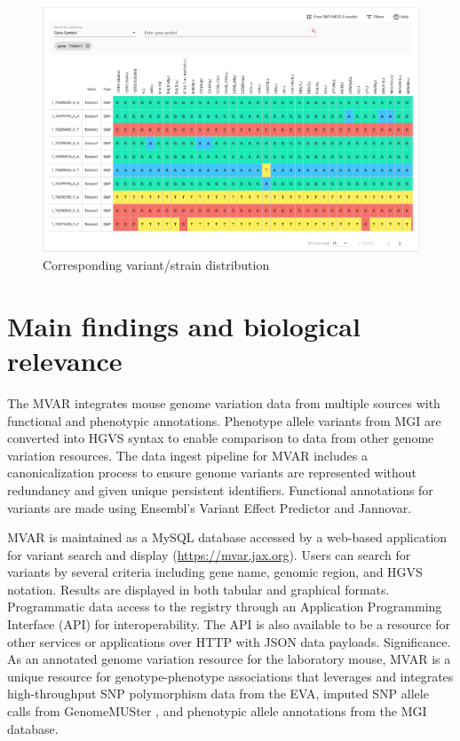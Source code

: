 \documentclass{article}
\begin{document}
\begin{figure}
\centering
\includegraphics[width=0.9\linewidth]{variant_strain_distrib_ui.png}
\caption{\label{fig:variant_strain_distrib}Corresponding variant/strain distribution}
\end{figure}

\section{Main findings and biological relevance}

The MVAR integrates mouse genome variation data from multiple sources with functional and phenotypic annotations. Phenotype allele variants from MGI are converted into HGVS syntax to enable comparison to data from other genome variation resources. The data ingest pipeline for MVAR includes a canonicalization process to ensure genome variants are represented without redundancy and given unique persistent identifiers. Functional annotations for variants are made using Ensembl’s Variant Effect Predictor and Jannovar.

MVAR is maintained as a MySQL database accessed by a web-based application for variant search and display (\url{https://mvar.jax.org}). Users can search for variants by several criteria including gene name, genomic region, and HGVS notation. Results are displayed in both tabular and graphical formats. Programmatic data access to the registry through an Application Programming Interface (API) for interoperability. The API is also available to be a resource for other services or applications over HTTP with JSON data payloads. 
Significance. As an annotated genome variation resource for the laboratory mouse, MVAR is a unique resource for genotype-phenotype associations that leverages and integrates high-throughput SNP polymorphism data from the EVA, imputed SNP allele calls from GenomeMUSter \cite{ball23}, and phenotypic allele annotations from the MGI database.
\end{document}
